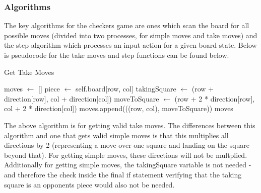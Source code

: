 \documentclass{article}
\begin{document}
    \subsubsection{Algorithms}
    The key algorithms for the checkers game are ones which scan the board for all possible moves (divided into two processes, for simple moves and take moves) and the step algorithm which processes an input action for a given board state.
    Below is pseudocode for the take moves and step functions can be found below.

    \begin{algorithm}
        \caption{Get Take Moves}
        \begin{algorithmic}
                \State moves $\gets$ []
                        \State piece $\gets$ self.board[row, col]
                                    \State takingSquare $\gets$ (row + direction[row], col + direction[col])
                                    \State moveToSquare $\gets$ (row + 2 * direction[row], col + 2 * direction[col])
                                        \State moves.append(((row, col), moveToSquare))
                                    \EndIf
                                \EndIf
                            \EndFor
                        \EndIf
                    \EndFor
                \EndFor
                \State \Return moves
            \EndFunction
        \end{algorithmic}
    \end{algorithm}
    The above algorithm is for getting valid take moves. The differences between this algorithm and one that gets
    valid simple moves is that this multiplies all directions by 2 (representing a move over one square and landing on
    the square beyond that). For getting simple moves, these directions will not be multplied. Additionally for getting simple moves,
    the takingSquare variable is not needed - and therefore the check inside the final if statement verifying that the taking square is
    an opponents piece would also not be needed.
\end{document}
